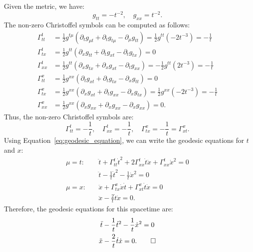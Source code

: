 \begin{solution}[(iii)]
  Given the metric, we have:
  \[%
    g_{tt} = -t^{-2}, \quad g_{xx} = t^{-2}
  .\]%
  The non-zero Christoffel symbols can be computed as follows:
  \begin{align*}
    \Gamma_{tt}^t &= \frac{1}{2} g^{t\mu}(\partial_t g_{\mu t} + \partial_t g_{t\mu} - \partial_\mu g_{tt}) = \frac{1}{2} g^{tt}(-2t^{-3}) = -\frac{1}{t} \\
    \Gamma_{tx}^t &= \frac{1}{2} g^{tt}(\partial_x g_{t t} + \partial_t g_{xt} - \partial_t g_{tx}) = 0 \\
    \Gamma_{xx}^t &= \frac{1}{2} g^{tt}(\partial_x g_{tx} + \partial_x g_{xt} - \partial_t g_{xx}) = -\frac{1}{2} g^{tt}(2t^{-3}) = -\frac{1}{t} \\
    \Gamma_{tt}^x &= \frac{1}{2} g^{xx}(\partial_t g_{xt} + \partial_t g_{tx} - \partial_x g_{tt}) = 0 \\
    \Gamma_{tx}^x &= \frac{1}{2} g^{xx}(\partial_x g_{xt} + \partial_t g_{xx} - \partial_x g_{tx}) = \frac{1}{2} g^{xx}(-2t^{-3}) = -\frac{1}{t} \\
    \Gamma_{xx}^x &= \frac{1}{2} g^{xx}(\partial_x g_{xx} + \partial_x g_{xx} - \partial_x g_{xx}) = 0
  .\end{align*}
  Thus, the non-zero Christoffel symbols are:
  \[%
    \Gamma_{tt}^t = -\frac{1}{t}, \quad \Gamma_{xx}^t = -\frac{1}{t}, \quad \Gamma_{tx}^x = -\frac{1}{t} = \Gamma_{xt}^x
  .\]%
  Using Equation~\eqref{eq:geodesic_equation}, we can write the geodesic equations for $t$ and $x$:
  \begin{align*}
    \mu = t:\quad& \ddot{t} + \Gamma_{tt}^t \dot{t}^2 + 2\Gamma_{xx}^t \dot{t}\dot{x} + \Gamma_{xx}^t \dot{x}^2 = 0 \\
                 & \ddot{t} - \frac{1}{t} \dot{t}^2 - \frac{1}{t} \dot{x}^2 = 0 \\
    \mu = x:\quad& \ddot{x} + \Gamma_{tx}^x \dot{x}\dot{t} + \Gamma_{xt}^x \dot{t}\dot{x} = 0 \\
                 & \ddot{x} - \frac{2}{t} \dot{t}\dot{x} = 0
  .\end{align*}
  Therefore, the geodesic equations for this spacetime are:
  \begin{gather*}
    \ddot{t} - \frac{1}{t} \dot{t}^2 - \frac{1}{t} \dot{x}^2 = 0 \\
    \ddot{x} - \frac{2}{t} \dot{t}\dot{x} = 0
  .\qedhere\end{gather*}
\end{solution}

